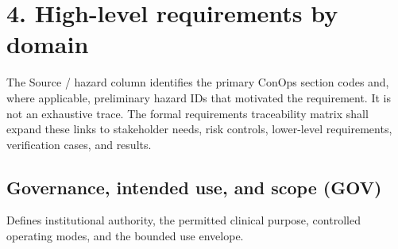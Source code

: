 \documentclass[11pt,letterpaper]{article}
\begin{document}
\section{4. High-level requirements by domain}

The Source \slash\allowbreak{} hazard column identifies the primary ConOps section codes and, where applicable, preliminary hazard IDs that motivated the requirement. It is not an exhaustive trace. The formal requirements traceability matrix shall expand these links to stakeholder needs, risk controls, lower-level requirements, verification cases, and results.

\subsection{Governance, intended use, and scope (GOV)}

Defines institutional authority, the permitted clinical purpose, controlled operating modes, and the bounded use envelope.
\end{document}
